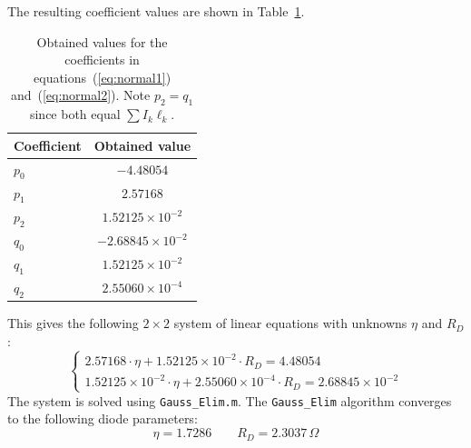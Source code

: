 \documentclass[12pt,a4paper]{article}
\begin{document}
The resulting coefficient values are shown in Table~\ref{tab:diode_coeffs}.

\begin{table}[H]
    \centering
    \begin{tabular}{lc}
        \toprule
        Coefficient & Obtained value \\
        \midrule
        $p_0$ & $-4.48054$ \\
        $p_1$ & $2.57168$ \\
        $p_2$ & $1.52125\times10^{-2}$ \\
        $q_0$ & $-2.68845\times10^{-2}$ \\
        $q_1$ & $1.52125\times10^{-2}$ \\
        $q_2$ & $2.55060\times10^{-4}$ \\
        \bottomrule
    \end{tabular}
    \caption{Obtained values for the coefficients in equations~(\ref{eq:normal1})
             and~(\ref{eq:normal2}). Note $p_2 = q_1$ since both equal $\sum I_k \ell_k$.}
    \label{tab:diode_coeffs}
\end{table}

This gives the following $2\times2$ system of linear equations with unknowns $\eta$ and $R_D$:
\begin{equation}
    \begin{cases}
        2.57168\cdot\eta + 1.52125\times10^{-2}\cdot R_D = 4.48054 \\[4pt]
        1.52125\times10^{-2}\cdot\eta + 2.55060\times10^{-4}\cdot R_D = 2.68845\times10^{-2}
    \end{cases}
    \label{eq:diode_system}
\end{equation}
The system is solved using \texttt{Gauss\_Elim.m}. The \texttt{Gauss\_Elim} algorithm
converges to the following diode parameters:
\[
    \eta = 1.7286 \qquad R_D = 2.3037\,\Omega
\]
\end{document}
